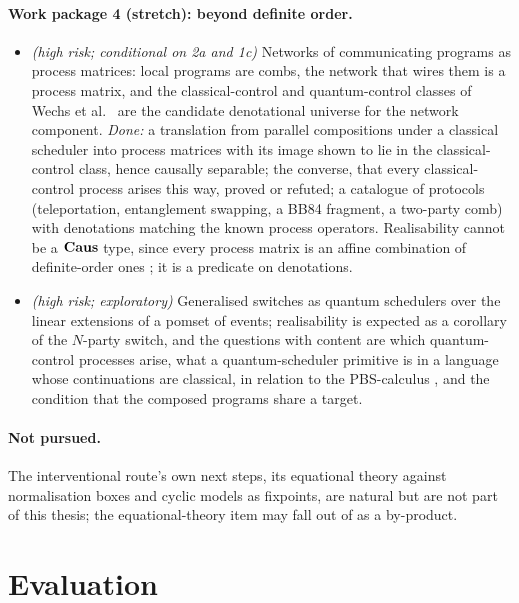 \paragraph{Work package 4 (stretch): beyond definite order.}
\begin{itemize}[nosep]
\item[4a] \textit{(high risk; conditional on 2a and 1c)} Networks of communicating programs as process matrices: local programs are combs, the network that wires them is a process matrix, and the classical-control and quantum-control classes of Wechs et al.\ \cite{wechs2021qcqc} are the candidate denotational universe for the network component. \emph{Done:} a translation from parallel compositions under a classical scheduler into process matrices with its image shown to lie in the classical-control class, hence causally separable; the converse, that every classical-control process arises this way, proved or refuted; a catalogue of protocols (teleportation, entanglement swapping, a BB84 fragment, a two-party comb) with denotations matching the known process operators. Realisability cannot be a $\mathbf{Caus}$ type, since every process matrix is an affine combination of definite-order ones \cite{simmons2024thesis}; it is a predicate on denotations. 
\item[4b] \textit{(high risk; exploratory)} Generalised switches as quantum schedulers over the linear extensions of a pomset of events; realisability is expected as a corollary of the $N$-party switch, and the questions with content are which quantum-control processes arise, what a quantum-scheduler primitive is in a language whose continuations are classical, in relation to the PBS-calculus \cite{clement2020pbs}, and the condition that the composed programs share a target.
\end{itemize}

\paragraph{Not pursued.} The interventional route's own next steps, its equational theory against normalisation boxes and cyclic models as fixpoints, are natural but are not part of this thesis; the equational-theory item may fall out of  as a by-product.

\section{Evaluation}

